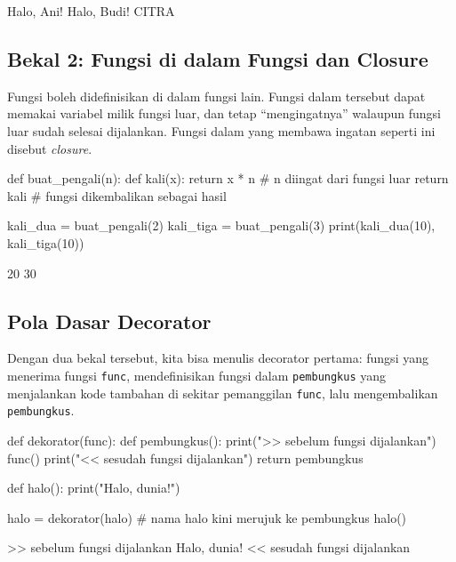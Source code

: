 \begin{keluaran}
Halo, Ani!
Halo, Budi!
CITRA
\end{keluaran}

\subsection{Bekal 2: Fungsi di dalam Fungsi dan Closure}

Fungsi boleh didefinisikan di dalam fungsi lain. Fungsi dalam tersebut dapat memakai variabel milik fungsi luar, dan tetap ``mengingatnya'' walaupun fungsi luar sudah selesai dijalankan. Fungsi dalam yang membawa ingatan seperti ini disebut \emph{closure}.

\begin{kode}[Closure]
def buat_pengali(n):
    def kali(x):
        return x * n            # n diingat dari fungsi luar
    return kali                 # fungsi dikembalikan sebagai hasil

kali_dua = buat_pengali(2)
kali_tiga = buat_pengali(3)
print(kali_dua(10), kali_tiga(10))
\end{kode}

\begin{keluaran}
20 30
\end{keluaran}

\subsection{Pola Dasar Decorator}

Dengan dua bekal tersebut, kita bisa menulis decorator pertama: fungsi yang menerima fungsi \texttt{func}, mendefinisikan fungsi dalam \texttt{pembungkus} yang menjalankan kode tambahan di sekitar pemanggilan \texttt{func}, lalu mengembalikan \texttt{pembungkus}.

\begin{kode}
def dekorator(func):
    def pembungkus():
        print(">> sebelum fungsi dijalankan")
        func()
        print("<< sesudah fungsi dijalankan")
    return pembungkus

def halo():
    print("Halo, dunia!")

halo = dekorator(halo)      # nama halo kini merujuk ke pembungkus
halo()
\end{kode}

\begin{keluaran}
>> sebelum fungsi dijalankan
Halo, dunia!
<< sesudah fungsi dijalankan
\end{keluaran}


